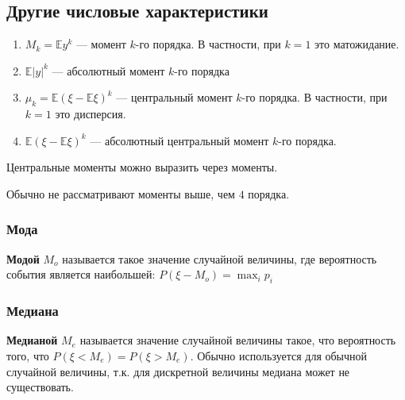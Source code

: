 \subsection{Другие числовые характеристики}

\begin{enumerate}
    \item \(M_k = \mathbb{E} y^k\) --- момент \(k\)-го порядка. В частности, при \(k = 1\) это матожидание.
    \item \(\mathbb{E}|y|^k\) --- абсолютный момент \(k\)-го порядка
    \item \(\mu_k = \mathbb{E}(\xi - \mathbb{E}\xi)^k\) --- центральный момент \(k\)-го порядка. В частности, при \(k = 1\) это дисперсия.
    \item \(\mathbb{E}(\xi - \mathbb{E}\xi)^k\) --- абсолютный центральный момент \(k\)-го порядка.
\end{enumerate}

\begin{remark}
    Центральные моменты можно выразить через моменты.
\end{remark}

\begin{remark}
    Обычно не рассматривают моменты выше, чем \(4\) порядка.
\end{remark}

\subsubsection{Мода}

\begin{definition}
    \textbf{Модой} \(M_o\) называется такое значение случайной величины, где вероятность события является наибольшей: \(P(\xi - M_o) = \max_i p_i\)
\end{definition}

\subsubsection{Медиана}

\begin{definition}
    \textbf{Медианой} \(M_e\) называется значение случайной величины такое, что вероятность того, что \(P(\xi < M_e) = P(\xi > M_e)\). Обычно используется для обычной случайной величины, т.к. для дискретной величины медиана может не существовать.
\end{definition}